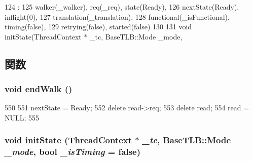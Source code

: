 \begin{DoxyCode}
124                                                                  :
125                         walker(_walker), req(_req), state(Ready),
126                         nextState(Ready), inflight(0),
127                         translation(_translation),
128                         functional(_isFunctional), timing(false),
129                         retrying(false), started(false)
130             {
131             }
            void initState(ThreadContext * _tc, BaseTLB::Mode _mode,
\end{DoxyCode}


\subsection{関数}
\hypertarget{classX86ISA_1_1Walker_1_1WalkerState_a040477c57c479fb61edb65bd58ca19d9}{
\subsubsection[{endWalk}]{\setlength{\rightskip}{0pt plus 5cm}void endWalk ()}}
\label{classX86ISA_1_1Walker_1_1WalkerState_a040477c57c479fb61edb65bd58ca19d9}



\begin{DoxyCode}
550 {
551     nextState = Ready;
552     delete read->req;
553     delete read;
554     read = NULL;
555 }
\end{DoxyCode}
\hypertarget{classX86ISA_1_1Walker_1_1WalkerState_a92aeb88528be9893c2e8fe61629fc942}{
\subsubsection[{initState}]{\setlength{\rightskip}{0pt plus 5cm}void initState ({\bf ThreadContext} $\ast$ {\em \_\-tc}, \/  {\bf BaseTLB::Mode} {\em \_\-mode}, \/  bool {\em \_\-isTiming} = {\ttfamily false})}}
\label{classX86ISA_1_1Walker_1_1WalkerState_a92aeb88528be9893c2e8fe61629fc942}



